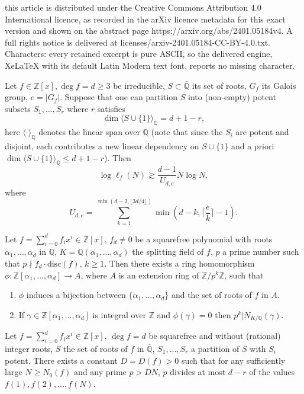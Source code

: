 \documentclass[10pt,a4paper]{amsart}
\newcommand{\Qb}{{\overline{\Q}}}
\newcommand{\Q}{{\mathbb Q}}
\newcommand{\Z}{{\mathbb Z}}
\newcommand{\disc}{{\mathrm{disc}}}
\begin{document}
this article is distributed under the Creative Commons Attribution 4.0 International licence, as recorded in the arXiv licence metadata for this exact version and shown on the abstract page https://arxiv.org/abs/2401.05184v4. A full rights notice is delivered at licenses/arxiv-2401.05184-CC-BY-4.0.txt. Characters: every retained excerpt is pure ASCII, so the delivered engine, XeLaTeX with its default Latin Modern text font, reports no missing character.
\begin{thm}\label{thm: main2}
Let $f\in\Z[x],\deg f=d\ge 3$ be irreducible, $S\subset\overline\Q$ its set of roots, $G_f$ its Galois group, $e=|G_f|$. Suppose that one can partition $S$ into (non-empty) potent subsets $S_1,\ldots,S_r$ where $r$ satisfies $$\dim\langle S\cup\{1\}\rangle_\Q=d+1-r,$$ here $\langle\cdot\rangle_\Q$ denotes the linear span over $\Q$ (note that since the $S_i$ are potent and disjoint, each contributes a new linear dependency on $S\cup\{1\}$ and a priori $\dim\langle S\cup\{1\}\rangle_\Q\le d+1-r$).
Then $$\log\ell_f(N)\gtrsim \frac {d-1}{U_{d,e}}N\log N,$$
where \begin{equation}\label{eq: def U_e}U_{d,e}=\sum_{k=1}^{\min(d-2,\lfloor 3d/4\rfloor)}\min \left(d-k,\bigg\lceil\frac {e}k\bigg\rceil-1\right).\end{equation}
\end{thm}

\begin{lem}\label{lem: hom} Let $f=\sum_{i=0}^df_ix^i\in\Z[x],\,f_d\neq 0$ be a squarefree polynomial with roots $\alpha_1,\ldots,\alpha_d$ in $\Qb$, $K=\Q(\alpha_1,\ldots,\alpha_d)$ the splitting field of $f$, $p$ a prime number such that $p\nmid f_d\cdot\disc(f)$, $k\ge 1$. Then there exists a ring homomorphism $\phi:\Z[\alpha_1,\ldots,\alpha_d]\to A$, where $A$ is an extension ring of $\Z/p^k\Z$, such that 
\begin{enumerate}
    \item[(i)] $\phi$ induces a bijection between $\{\alpha_1,\ldots,\alpha_d\}$ and the set of roots of $f$ in $A$.
    \item[(ii)] If $\gamma\in\Z[\alpha_1,\ldots,\alpha_d]$ is integral over $\Z$ and $\phi(\gamma)=0$ then $p^k|N_{K/\Q}(\gamma)$.
\end{enumerate}
\end{lem}

\begin{lem}\label{lem: main1} Let $f=\sum_{i=0}^df_ix^i\in\Z[x],\,\deg f=d$ be squarefree and without (rational) integer roots, $S$ the set of roots of $f$ in $\Qb$, $S_1,\ldots,S_r$ a partition of $S$ with $S_i$ potent. There exists a constant $D=D(f)>0$ such that for any sufficiently large $N\ge N_0(f)$ and any prime $p>DN$, $p$ divides at most $d-r$ of the values $f(1),f(2),\ldots,f(N)$.
\end{lem}
\end{document}
